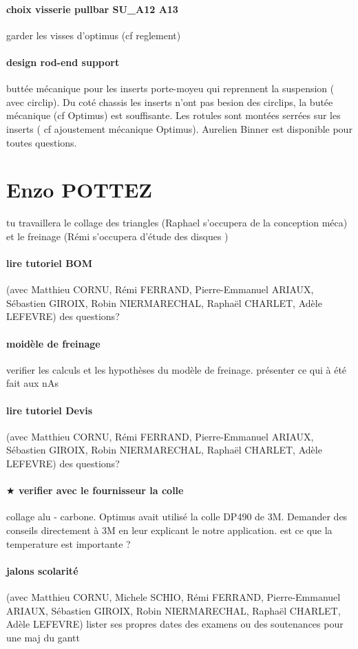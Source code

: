 \paragraph{choix visserie pullbar SU\_A12 A13} garder les visses d'optimus (cf reglement)
\paragraph{design rod-end support} buttée mécanique pour les inserts porte-moyeu qui reprennent la suspension ( avec circlip). Du coté chassis les inserts n'ont pas besion des circlips, la butée mécanique (cf Optimus) est souffisante. Les rotules sont montées serrées sur les inserts ( cf ajoustement mécanique Optimus). Aurelien Binner est disponible pour toutes questions.

 
 \newpage \section*{Enzo POTTEZ} 
 \par tu travaillera le collage des triangles (Raphael s'occupera de la conception méca) et le freinage (Rémi s'occupera d'étude des disques )
\paragraph{lire tutoriel BOM} (avec Matthieu CORNU, Rémi FERRAND, Pierre-Emmanuel ARIAUX, Sébastien GIROIX, Robin NIERMARECHAL, Raphaël CHARLET, Adèle LEFEVRE) des questions?
\paragraph{moidèle de freinage} verifier les calculs et les hypothèses du modèle de freinage. présenter ce qui à été fait aux nAs
\paragraph{lire tutoriel Devis} (avec Matthieu CORNU, Rémi FERRAND, Pierre-Emmanuel ARIAUX, Sébastien GIROIX, Robin NIERMARECHAL, Raphaël CHARLET, Adèle LEFEVRE) des questions?
\paragraph{$\bigstar$ verifier avec le fournisseur la colle} collage alu - carbone. Optimus avait utilisé la colle DP490 de 3M. Demander des conseils directement à 3M en leur explicant le notre application. est ce que la temperature est importante ?
\paragraph{jalons scolarité} (avec Matthieu CORNU, Michele SCHIO, Rémi FERRAND, Pierre-Emmanuel ARIAUX, Sébastien GIROIX, Robin NIERMARECHAL, Raphaël CHARLET, Adèle LEFEVRE) lister ses propres dates des examens ou des soutenances pour une maj du gantt
